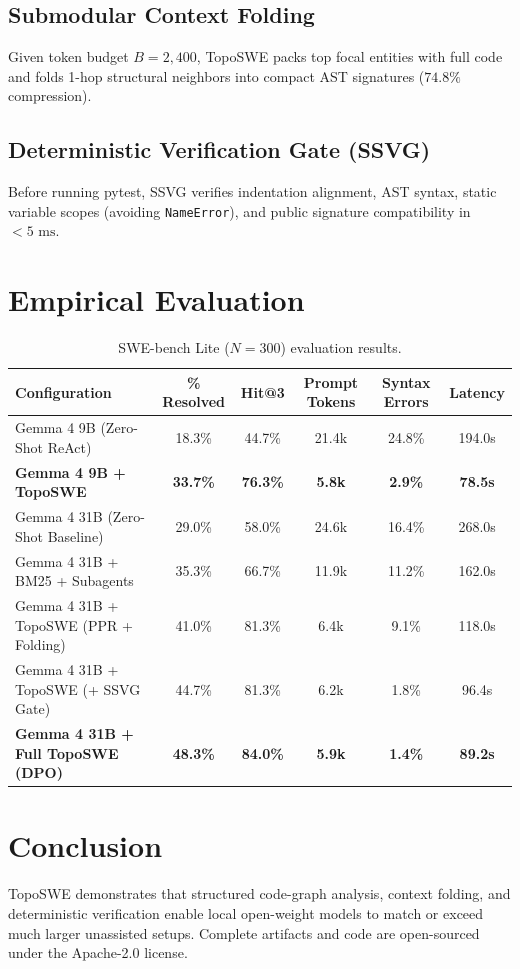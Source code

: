 \documentclass[11pt,a4paper]{article}
\begin{document}
\subsection{Submodular Context Folding}
Given token budget $B = 2{,}400$, TopoSWE packs top focal entities with full code and folds 1-hop structural neighbors into compact AST signatures ($74.8\%$ compression).

\subsection{Deterministic Verification Gate (SSVG)}
Before running pytest, SSVG verifies indentation alignment, AST syntax, static variable scopes (avoiding \texttt{NameError}), and public signature compatibility in $<5\text{ ms}$.

\section{Empirical Evaluation}
\begin{table}[h]
\centering
\small
\begin{tabular}{lccccc}
\toprule
\textbf{Configuration} & \textbf{\% Resolved} & \textbf{Hit@3} & \textbf{Prompt Tokens} & \textbf{Syntax Errors} & \textbf{Latency} \\
\midrule
Gemma 4 9B (Zero-Shot ReAct) & 18.3\% & 44.7\% & 21.4k & 24.8\% & 194.0s \\
\textbf{Gemma 4 9B + TopoSWE} & \textbf{33.7\%} & \textbf{76.3\%} & \textbf{5.8k} & \textbf{2.9\%} & \textbf{78.5s} \\
\midrule
Gemma 4 31B (Zero-Shot Baseline) & 29.0\% & 58.0\% & 24.6k & 16.4\% & 268.0s \\
Gemma 4 31B + BM25 + Subagents & 35.3\% & 66.7\% & 11.9k & 11.2\% & 162.0s \\
Gemma 4 31B + TopoSWE (PPR + Folding) & 41.0\% & 81.3\% & 6.4k & 9.1\% & 118.0s \\
Gemma 4 31B + TopoSWE (+ SSVG Gate) & 44.7\% & 81.3\% & 6.2k & 1.8\% & 96.4s \\
\textbf{Gemma 4 31B + Full TopoSWE (DPO)} & \textbf{48.3\%} & \textbf{84.0\%} & \textbf{5.9k} & \textbf{1.4\%} & \textbf{89.2s} \\
\bottomrule
\end{tabular}
\caption{SWE-bench Lite ($N=300$) evaluation results.}
\end{table}

\section{Conclusion}
TopoSWE demonstrates that structured code-graph analysis, context folding, and deterministic verification enable local open-weight models to match or exceed much larger unassisted setups. Complete artifacts and code are open-sourced under the Apache-2.0 license.
\end{document}
